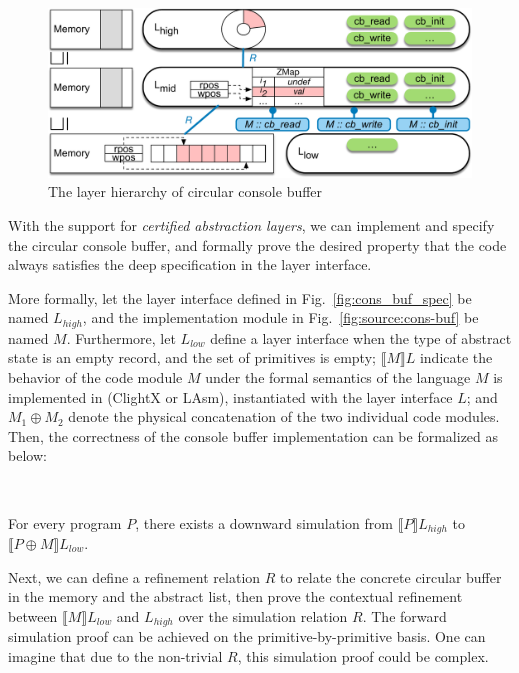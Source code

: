 \begin{figure}
	\begin{center}
		\includegraphics[scale=0.6]{figs/cons_buf}
	\end{center}
	\caption{The layer hierarchy of circular console buffer}
	\label{fig:layer:cons-buf}
\end{figure}

With the support for {\it certified abstraction layers}, we can implement and
specify the circular console buffer, and formally prove the desired property
that the code always satisfies the deep specification in the layer interface.

More formally, let the layer interface defined
in Fig.~\ref{fig:cons_buf_spec} be named $L_{high}$, and the implementation
module in Fig.~\ref{fig:source:cons-buf} be named $M$.
Furthermore, let 
$L_{low}$ define a layer interface when the type of abstract state
is an empty record, and the set of primitives is empty;
$\llbracket{}M\rrbracket{}L$ indicate the behavior of the code module $M$
under the formal semantics of the language $M$ is implemented in (ClightX or LAsm),
instantiated with the layer interface $L$; and $M_1 \oplus M_2$ denote the physical
concatenation of the two individual code modules. Then, the correctness of
the console buffer implementation can be formalized as below:

\begin{lemma}
$ $

For every program $P$, there exists a downward simulation from
$\llbracket{}P\rrbracket{}L_{high}$
to $\llbracket{}{P \oplus M}\rrbracket{}L_{low}$.
\end{lemma}

Next, we can define a refinement relation $R$ to relate the concrete circular
buffer in the memory and the abstract list, then prove the contextual refinement
between $\llbracket{}M\rrbracket{}L_{low}$ and $L_{high}$ over the simulation
relation $R$. The forward simulation proof can be achieved on the
primitive-by-primitive basis. One can imagine that due to the non-trivial $R$,
this simulation proof could be complex.

